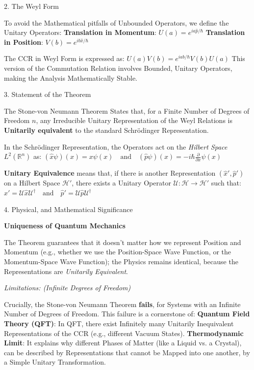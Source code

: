 \documentclass[a4paper, 10pt, onepage]{elegantbook}
\begin{document}
{    2. The Weyl Form  

To avoid the Mathematical pitfalls of Unbounded Operators, we define the Unitary Operators:
 \textbf{Translation in Momentum}: $U(a) = e^{i a \hat{p} / \hbar}$  
 \textbf{Translation in Position}: $V(b) = e^{i b \hat{x} / \hbar}$  

The CCR in Weyl Form is expressed as:
$U(a)V(b) = e^{iab/\hbar} V(b)U(a)$  
This version of the Commutation Relation involves Bounded, Unitary Operators, making the Analysis Mathematically 
Stable.  

    3. Statement of the Theorem  

The Stone-von Neumann Theorem States that, for a Finite Number of Degrees of Freedom $n$, any Irreducible Unitary 
Representation of the Weyl Relations is \textbf{Unitarily equivalent} to the standard Schr\"odinger 
Representation.  

In the Schr\"odinger Representation, the Operators act on the \emph{Hilbert Space} $L^2(\mathbb{R}^n)$ as: 
$(\hat{x} \psi)(x) = x \psi(x) \quad \text{and} \quad (\hat{p} \psi)(x) = -i\hbar \frac{\partial}{\partial x} \psi(x)$  

  \textbf{Unitary Equivalence} means that, if there is another Representation $(\hat{x}', \hat{p}')$ on a Hilbert Space 
$\mathcal{H}'$, there exists a Unitary Operator $\mathcal{U} : \mathcal{H} \to \mathcal{H}'$ such that:  
$\hat{x}' = \mathcal{U} \hat{x} \mathcal{U}^\dagger \quad \text{and} \quad \hat{p}' = \mathcal{U} \hat{p} 
\mathcal{U}^\dagger$

    4. Physical, and Mathematical Significance  

  \textbf{Uniqueness of Quantum Mechanics}  

The Theorem guarantees that it doesn't matter how we represent Position and Momentum (e.g., whether we use the 
Position-Space Wave Function, or the Momentum-Space Wave Function); the Physics remains identical, because the 
Representations are \emph{Unitarily Equivalent}.  

     \emph{Limitations: (Infinite Degrees of Freedom)}  

Crucially, the Stone-von Neumann Theorem \textbf{fails}, for Systems with an Infinite Number of Degrees of Freedom. 
This failure is a cornerstone of:
 \textbf{Quantum Field Theory (QFT)}: In QFT, there exist Infinitely many Unitarily Inequivalent Representations of the 
CCR (e.g., different Vacuum States).  
 \textbf{Thermodynamic Limit}: It explains why different Phases of Matter (like a Liquid vs. a Crystal), can be 
described by Representations that cannot be Mapped into one another, by a Simple Unitary Transformation.  

}
\end{document}
